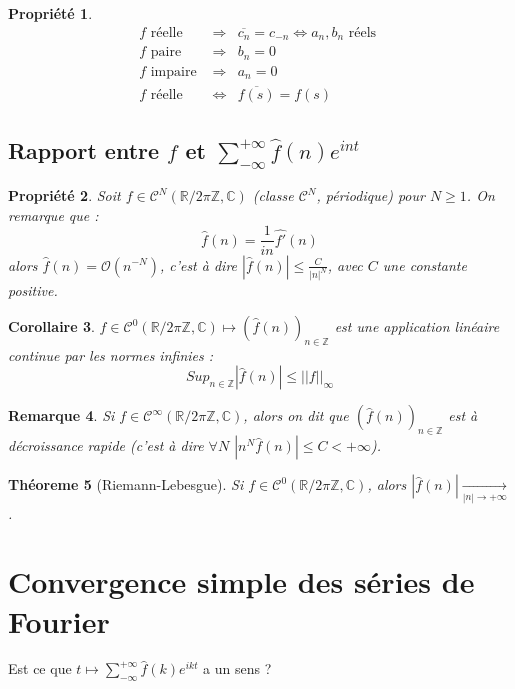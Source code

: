 \documentclass[a4paper, oneside]{report}
\theoremstyle{break}
\newtheorem{thm}{Théoreme}[section] %
\newtheorem{propr}[thm]{Propriété}
\newtheorem{cor}[thm]{Corollaire}
\newtheorem{remar}[thm]{Remarque}
\newcommand{\R}{\mathbb{R}}
\newcommand{\C}{\mathbb{C}}
\newcommand{\Z}{\mathbb{Z}}
\newcommand{\fracun}[1]{\frac{1}{#1}}
\begin{document}
\begin{propr}
$$\begin{array}{lll}
f \text{ réelle } &\Rightarrow& \overline{c_n}=c_{-n}\Leftrightarrow a_n, b_n \text{ réels }\\
f \text{ paire } &\Rightarrow& b_n=0\\
f \text{ impaire } &\Rightarrow& a_n=0\\
f \text{ réelle } &\Leftrightarrow& \overline{f(s)}=f(s)
\end{array}$$
\end{propr}

\subsection{Rapport entre $f$ et $\sum_{-\infty}^{+\infty}\widehat{f}(n)e^{int}$}

\begin{propr}
Soit $f\in \mathcal{C}^{N}(\R/2\pi \Z, \C)$ (classe $\mathcal{C}^N$, périodique) pour $N\geq 1$. On remarque que :
$$\widehat{f}(n)=\fracun{in}\widehat{f'}(n)$$
alors $\widehat{f}(n)=\mathcal{O}(n^{-N})$, c'est à dire $|\widehat{f}(n)| \leq \frac{C}{|n|^N}$, avec $C$ une constante positive.
\end{propr}

\begin{cor}
$f\in \mathcal{C}^0(\R/2\pi\Z, \C)\mapsto (\widehat{f}(n))_{n\in \Z}$ est une application linéaire continue par les normes infinies :
$$Sup_{n\in \Z}|\widehat{f}(n)| \leq ||f||_\infty$$
\end{cor}

\begin{remar}
Si $f\in \mathcal{C}^\infty(\R/2\pi\Z, \C)$, alors on dit que $(\widehat{f}(n))_{n\in \Z}$ est à décroissance rapide (c'est à dire $\forall N$ $|n^N \widehat{f}(n)| \leq C < +\infty$).
\end{remar}

\begin{thm}[Riemann-Lebesgue]
Si $f\in \mathcal{C}^0(\R/2\pi\Z, \C)$, alors $|\widehat{f}(n)| \underset{|n| \rightarrow +\infty}{\rightarrow}$.
\end{thm}

\section{Convergence simple des séries de Fourier}
Est ce que $t\mapsto \sum_{-\infty}^{+\infty}\widehat{f}(k)e^{ikt}$ a un sens ?\\
\end{document}
